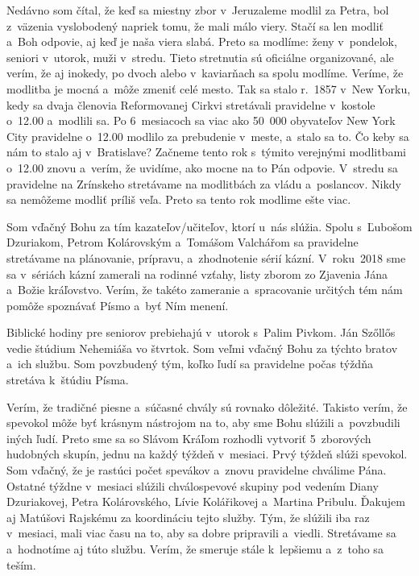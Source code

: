 Nedávno som čítal, že keď sa miestny zbor v~Jeruzaleme modlil za Petra, bol z~väzenia vyslobodený napriek tomu, že mali málo viery. Stačí sa len modliť a~Boh odpovie, aj keď je naša viera slabá. Preto sa modlíme:  ženy v~pondelok, seniori v~utorok, muži v~stredu. Tieto stretnutia sú oficiálne organizované, ale verím, že aj inokedy, po dvoch alebo v~kaviarňach sa spolu modlíme. Veríme, že modlitba je mocná a~môže zmeniť celé mesto. Tak sa stalo r.~1857 v~New Yorku, kedy sa dvaja členovia Reformovanej Cirkvi stretávali pravidelne v~kostole o~12.00 a~modlili sa. Po 6~mesiacoch sa viac ako 50~000 obyvateľov New York City pravidelne o~12.00 modlilo za prebudenie v~meste, a~stalo sa to. Čo keby sa nám to stalo aj v~Bratislave? Začneme tento rok s~týmito verejnými modlitbami o~12.00 znovu a~verím, že uvidíme, ako mocne na to Pán odpovie. V~stredu sa pravidelne na Zrínskeho stretávame na modlitbách za vládu a~poslancov. Nikdy sa nemôžeme modliť príliš veľa. Preto sa tento rok modlime ešte viac.


Som vďačný Bohu za tím kazateľov/učiteľov, ktorí u~nás slúžia. Spolu s~Ľubošom Dzuriakom, Petrom Kolárovským a~Tomášom Valchářom sa pravidelne stretávame na plánovanie, prípravu, a~zhodnotenie sérií kázní. V~roku~2018 sme sa v~sériách kázní zamerali na rodinné vzťahy, listy zborom zo Zjavenia Jána a~Božie kráľovstvo. Verím, že takéto zameranie a~spracovanie určitých tém nám pomôže spoznávať Písmo a~byť Ním menení.

Biblické hodiny pre seniorov prebiehajú v~utorok s~Palim Pivkom. Ján Szőllős vedie štúdium Nehemiáša vo štvrtok. Som veľmi vďačný Bohu za týchto bratov a~ich službu. Som povzbudený tým, koľko ľudí sa pravidelne počas týždňa stretáva k~štúdiu Písma.


Verím, že tradičné piesne a~súčasné chvály sú rovnako dôležité. Takisto verím, že spevokol môže byť krásnym nástrojom na to, aby sme Bohu slúžili a~povzbudili iných ľudí. Preto sme sa so Slávom Kráľom rozhodli vytvoriť 5~zborových hudobných skupín, jednu na každý týždeň v~mesiaci. Prvý týždeň slúži spevokol. Som vďačný, že je rastúci počet spevákov a~znovu pravidelne chválime Pána. Ostatné týždne v~mesiaci slúžili chválospevové skupiny pod vedením Diany Dzuriakovej, Petra Kolárovského, Lívie Kolářikovej a~Martina Pribulu. Ďakujem aj Matúšovi Rajskému za koordináciu tejto služby.  Tým, že slúžili iba raz v~mesiaci, mali viac času na to, aby sa dobre pripravili a~viedli. Stretávame sa a~hodnotíme aj túto službu. Verím, že smeruje stále k~lepšiemu a~z~toho sa teším.

